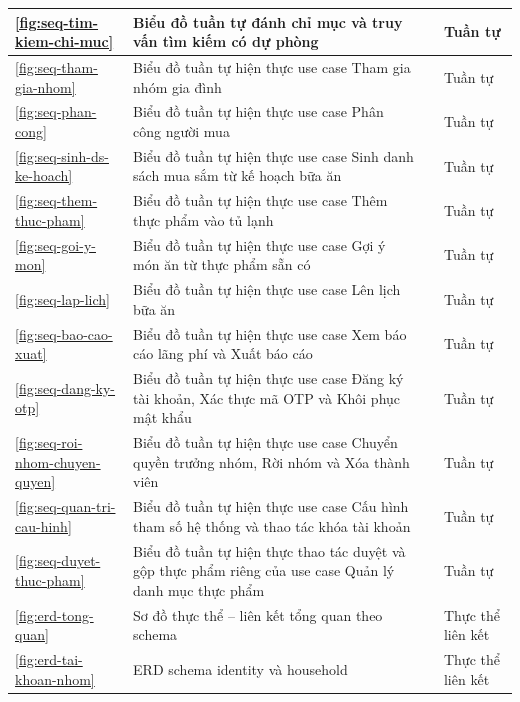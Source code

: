 {\begin{longtable}{|C{1.3cm}|L{\dimexpr{}\arrayrulewidth-1.3cm-5.6cm-2.4cm\relax}|L{5.6cm}|L{2.4cm}|}
\ref{fig:seq-tim-kiem-chi-muc} & Biểu đồ tuần tự đánh chỉ mục và truy vấn tìm kiếm có dự phòng &  & Tuần tự\\ \hline
\ref{fig:seq-tham-gia-nhom} & Biểu đồ tuần tự hiện thực use case Tham gia nhóm gia đình &  & Tuần tự\\ \hline
\ref{fig:seq-phan-cong} & Biểu đồ tuần tự hiện thực use case Phân công người mua &  & Tuần tự\\ \hline
\ref{fig:seq-sinh-ds-ke-hoach} & Biểu đồ tuần tự hiện thực use case Sinh danh sách mua sắm từ kế hoạch bữa ăn &  & Tuần tự\\ \hline
\ref{fig:seq-them-thuc-pham} & Biểu đồ tuần tự hiện thực use case Thêm thực phẩm vào tủ lạnh &  & Tuần tự\\ \hline
\ref{fig:seq-goi-y-mon} & Biểu đồ tuần tự hiện thực use case Gợi ý món ăn từ thực phẩm sẵn có &  & Tuần tự\\ \hline
\ref{fig:seq-lap-lich} & Biểu đồ tuần tự hiện thực use case Lên lịch bữa ăn &  & Tuần tự\\ \hline
\ref{fig:seq-bao-cao-xuat} & Biểu đồ tuần tự hiện thực use case Xem báo cáo lãng phí và Xuất báo cáo &  & Tuần tự\\ \hline
\ref{fig:seq-dang-ky-otp} & Biểu đồ tuần tự hiện thực use case Đăng ký tài khoản, Xác thực mã OTP và Khôi phục mật khẩu &  & Tuần tự\\ \hline
\ref{fig:seq-roi-nhom-chuyen-quyen} & Biểu đồ tuần tự hiện thực use case Chuyển quyền trưởng nhóm, Rời nhóm và Xóa thành viên &  & Tuần tự\\ \hline
\ref{fig:seq-quan-tri-cau-hinh} & Biểu đồ tuần tự hiện thực use case Cấu hình tham số hệ thống và thao tác khóa tài khoản &  & Tuần tự\\ \hline
\ref{fig:seq-duyet-thuc-pham} & Biểu đồ tuần tự hiện thực thao tác duyệt và gộp thực phẩm riêng của use case Quản lý danh mục thực phẩm &  & Tuần tự\\ \hline
\ref{fig:erd-tong-quan} & Sơ đồ thực thể -- liên kết tổng quan theo schema &  & Thực thể liên kết\\ \hline
\ref{fig:erd-tai-khoan-nhom} & ERD schema identity và household &  & Thực thể liên kết\\ \hline

\end{longtable}}
